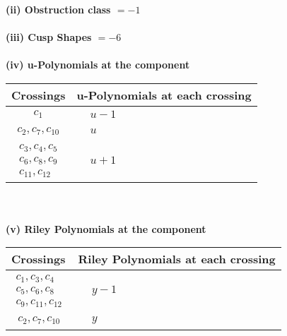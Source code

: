 \documentclass[1p]{elsarticle_modified}
\theoremstyle{definition}
\begin{document}
\flushleft \textbf{(ii) Obstruction class $= -1$}\\~\\
\flushleft \textbf{(iii) Cusp Shapes $= -6$}\\~\\
\newpage\renewcommand{\arraystretch}{1}
\flushleft \textbf{(iv) u-Polynomials at the component}\newline \\
\begin{tabular}{m{50pt}|m{274pt}}
Crossings & \hspace{64pt}u-Polynomials at each crossing \\
\hline $$\begin{aligned}c_{1}\end{aligned}$$&$\begin{aligned}
&u-1
\end{aligned}$\\
\hline $$\begin{aligned}c_{2},c_{7},c_{10}\end{aligned}$$&$\begin{aligned}
&u
\end{aligned}$\\
\hline $$\begin{aligned}c_{3},c_{4},c_{5}\\c_{6},c_{8},c_{9}\\c_{11},c_{12}\end{aligned}$$&$\begin{aligned}
&u+1
\end{aligned}$\\
\hline
\end{tabular}\\~\\
\newpage\renewcommand{\arraystretch}{1}
\flushleft \textbf{(v) Riley Polynomials at the component}\newline \\
\begin{tabular}{m{50pt}|m{274pt}}
Crossings & \hspace{64pt}Riley Polynomials at each crossing \\
\hline $$\begin{aligned}c_{1},c_{3},c_{4}\\c_{5},c_{6},c_{8}\\c_{9},c_{11},c_{12}\end{aligned}$$&$\begin{aligned}
&y-1
\end{aligned}$\\
\hline $$\begin{aligned}c_{2},c_{7},c_{10}\end{aligned}$$&$\begin{aligned}
&y
\end{aligned}$\\
\hline
\end{tabular}\\~\\
\end{document}

